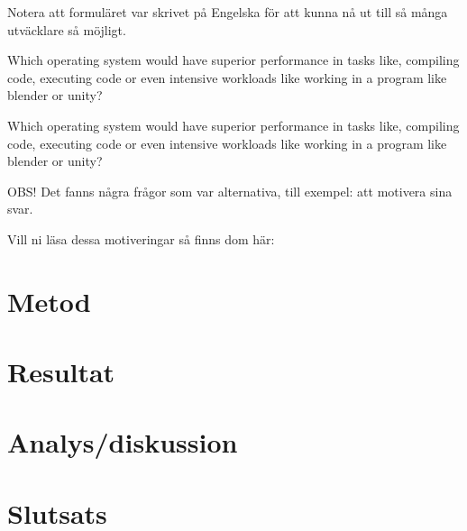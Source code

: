 \documentclass[a4paper, 12pt]{report}
\begin{document}
    Notera att formuläret var skrivet på Engelska för att kunna nå ut till så många utväcklare så möjligt.


    \vspace{8.7cm}


    \large {Which operating system would have superior performance in tasks like, compiling code, executing code or even intensive workloads like working in a program  like blender or unity?}

    \vspace{.2cm}


    \cite{form}
    \vspace{1cm}

    \large {Which operating system would have superior performance in tasks like, compiling code, executing code or even intensive workloads like working in a program  like blender or unity?}

    \vspace{.5cm}



    \cite{form}

    \vspace{1cm}


    \small{OBS! Det fanns några frågor som var alternativa, till exempel: att motivera sina svar.
    
    Vill ni läsa dessa motiveringar så finns dom här:} 


\section{Metod}



\section{Resultat}

\section{Analys/diskussion}



\section{Slutsats}


\printbibliography
\end{document}
